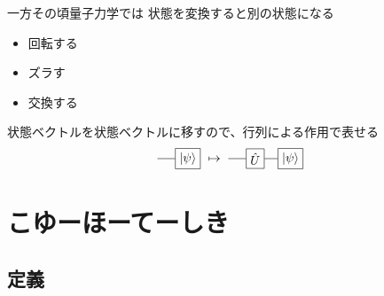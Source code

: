 \documentclass[dvipdfm]{beamer}
\begin{document}
\begin{frame}{一方その頃量子力学では}
    状態を変換すると別の状態になる
    \begin{itemize}
        \item 回転する
        \item ズラす
        \item 交換する
    \end{itemize}
    状態ベクトルを状態ベクトルに移すので、行列による作用で表せる
    \begin{equation*}
        \vcenter{\hbox{
            \begin{tikzpicture}
                \node at(1,0)[draw, rectangle](psi){$\ket{\psi}$};
                \draw(psi.west)--++(-.5,0);
            \end{tikzpicture}
        }}
        \mapsto
        \vcenter{\hbox{
            \begin{tikzpicture}
                \node at(0,0)[draw, rectangle](H){$\hat{U}$};
                \node at(1,0)[draw, rectangle](psi){$\ket{\psi}$};
                \draw(H.east)--(psi.west)(H.west)--++(-.5,0);
            \end{tikzpicture}
        }}
    \end{equation*}
\end{frame}


\section{こゆーほーてーしき}

\subsection{定義}
\end{document}

